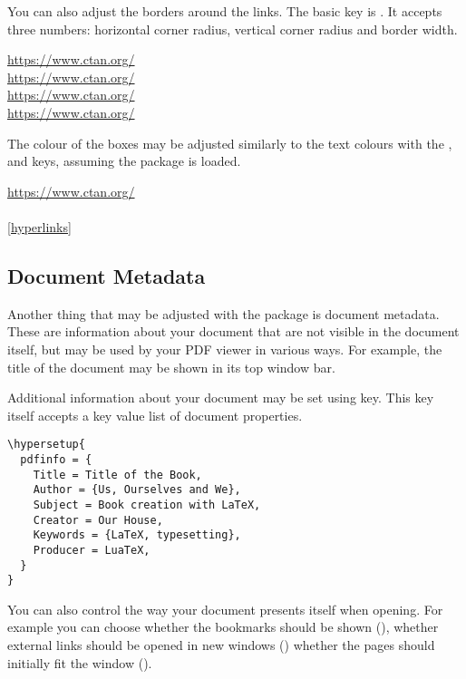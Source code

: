 You can also adjust the borders around the links. The basic key is
. It accepts three numbers: horizontal corner radius, vertical
corner radius and border width.
\begin{example}
\hypersetup{pdfborder = 0 0 1}
\url{https://www.ctan.org/} \\
\hypersetup{pdfborder = 10 10 3}
\url{https://www.ctan.org/} \\
\hypersetup{pdfborder = 10 5 2}
\url{https://www.ctan.org/} \\
\hypersetup{pdfborder = 2 7 5}
\url{https://www.ctan.org/}
\end{example}
The colour of the boxes may be adjusted similarly to the text colours with the
,  and 
keys, assuming the  package is loaded.
\begin{chktexignore}
  \begin{example}
\hypersetup{
  pdfborder = 0 0 2,
  urlbordercolor = violet,
  citebordercolor = pink,
  linkbordercolor = teal,
}
\url{https://www.ctan.org/} \\
\cite{pack:hyperref} \\
\autoref{hyperlinks}
\end{example}
\end{chktexignore}

\subsection{Document Metadata}\label{sec:pdfmeta}

Another thing that may be adjusted with the  package is document
metadata. These are information about your document that are not visible in the
document itself, but may be used by your PDF viewer in various ways. For
example, the title of the document may be shown in its top window bar.

Additional information about your document may be set using 
key. This key itself accepts a key value list of document properties.
\begin{verbatim}
\hypersetup{
  pdfinfo = {
    Title = Title of the Book,
    Author = {Us, Ourselves and We},
    Subject = Book creation with LaTeX,
    Creator = Our House,
    Keywords = {LaTeX, typesetting},
    Producer = LuaTeX,
  }
}
\end{verbatim}

You can also control the way your document presents itself when opening. For
example you can choose whether the bookmarks should be shown
(), whether external links should be opened in new windows
() whether the pages should initially fit the window
().

